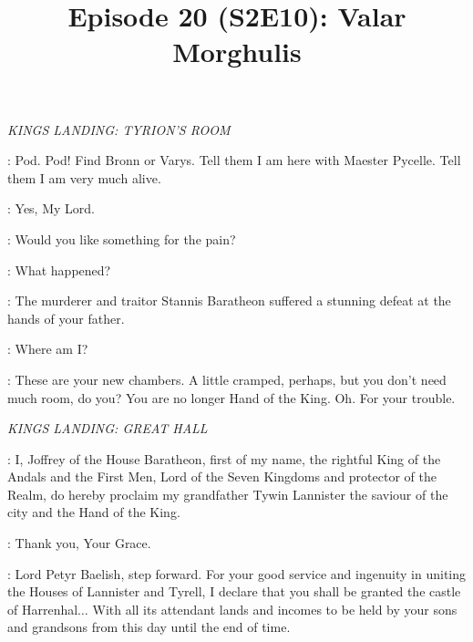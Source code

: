 

\title{Episode 20 (S2E10): Valar Morghulis}
\author{}
\date{}
\maketitle



\scene

\textit{KINGS LANDING: TYRION'S ROOM} 


\TYRION: Pod. Pod!  Find Bronn or Varys. Tell them I am here with Maester Pycelle. Tell them I am very much alive. 

\PODRICK: Yes, My Lord. 

\PYCELLE: Would you like something for the pain? 

\TYRION: What happened? 

\PYCELLE: The murderer and traitor Stannis Baratheon suffered a stunning defeat at the hands of your father. 

\TYRION: Where am I? 

\PYCELLE: These are your new chambers. A little cramped, perhaps, but you don't need much room, do you? You are no longer Hand of the King. Oh. For your trouble. 



\scene

\textit{KINGS LANDING: GREAT HALL} 


\JOFFREY: I, Joffrey of the House Baratheon, first of my name, the rightful King of the Andals and the First Men, Lord of the Seven Kingdoms and protector of the Realm, do hereby proclaim my grandfather Tywin Lannister the saviour of the city and the Hand of the King. 

\TYWIN: Thank you, Your Grace. 

\JOFFREY: Lord Petyr Baelish, step forward. For your good service and ingenuity in uniting the Houses of Lannister and Tyrell, I declare that you shall be granted the castle of Harrenhal$\ldots$ With all its attendant lands and incomes to be held by your sons and grandsons from this day until the end of time. 

